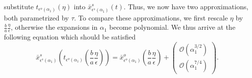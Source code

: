substitute $t_{\epsilon^o(\alpha_1)}(\eta)$ into $\bar x_{\epsilon^s(\alpha_1)}^s(t)$.
Thus, we now have two approximations, both parametrized by $\tau$. To compare these
approximations, we first rescale $\eta$ by $\frac{b}{a}\frac{\eta}{\epsilon}$,
otherwise the expansions in $\alpha_1$ become polynomial. We thus arrive at the
following equation which should be satisfied
\begin{equation*}
    \bar x_{\epsilon^s(\alpha_1)}^s\left(t_{\epsilon^o(\alpha_1)}\left(\frac{b}{a}\frac{\eta}{\epsilon}\right)\right) =
    \bar x_{\epsilon^o(\alpha_1)}^o\left(\frac{b}{a}\frac{\eta}{\epsilon} \right) +
    \begin{pmatrix}
        \mathcal{O}(\alpha_1^{3/2}) \\
        \mathcal{O}(\alpha_1^{7/4})
    \end{pmatrix}.
\end{equation*}

